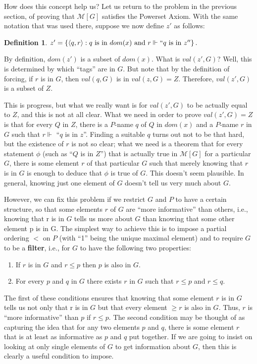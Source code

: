 \documentclass[10pt]{article}
\theoremstyle{definition}
\newtheorem*{defn}{Definition}
\theoremstyle{remark}
\begin{document}
How does this concept help us? Let us return to the problem in the previous section, of proving that $\mathcal M[G]$ satisfies the Powerset Axiom. With the same notation that was used there, suppose we now define $z'$ as follows:

\begin{defn}
$z' = \left\{\langle q,r\rangle : q\text{ is in }dom(x)\text{ and }r \Vdash ``q\text{ is in }z''\right\}.$
\end{defn}

By definition, $dom(z')$ is a subset of $dom(x)$. What is $val(z',G)$? Well, this is determined by which ``tags'' are in $G$. But note that by the definition of forcing, if $r$ is in $G$, then $val(q,G)$ is in $val(z,G) = Z$. Therefore, $val(z',G)$ is a subset of $Z$.

This is progress, but what we really want is for $val(z',G)$ to be actually equal to $Z$, and this is not at all clear. What we need in order to prove $val(z',G) = Z$ is that for every $Q$ in $Z$, there is a $P$-name $q$ of $Q$ in $dom(x)$ and a $P$-name $r$ in $G$ such that $r \Vdash$ ``$q$ is in $z$''. Finding a suitable $q$ turns out not to be that hard, but the existence of $r$ is not so clear; what we need is a theorem that for every statement $\phi$ (such as ``$Q$ is in $Z$'') that is actually true in $\mathcal M[G]$ for a particular $G$, there is some element $r$ of that particular $G$ such that merely knowing that $r$ is in $G$ is enough to deduce that $\phi$ is true of $G$. This doesn't seem plausible. In general, knowing just one element of $G$ doesn't tell us very much about $G$.

However, we can fix this problem if we restrict $G$ and $P$ to have a certain structure, so that some elements $r$ of $G$ are ``more informative'' than others, i.e., knowing that r is in $G$ tells us more about $G$ than knowing that some other element p is in G. The simplest way to achieve this is to impose a partial ordering $<$ on $P$ (with ``1'' being the unique maximal element) and to require $G$ to be a \textbf{filter}, i.e., for $G$ to have the following two properties:

\begin{enumerate}
\item If $r$ is in $G$ and $r \leq p$ then $p$ is also in $G$.
\item For every $p$ and $q$ in $G$ there exists $r$ in $G$ such that $r \leq p$ and $r \leq q$.
\end{enumerate}

The first of these conditions ensures that knowing that some element $r$ is in $G$ tells us not only that r is in $G$ but that every element $\geq r$ is also in $G$. Thus, $r$ is ``more informative'' than $p$ if $r \leq p$. The second condition may be thought of as capturing the idea that for any two elements $p$ and $q$, there is some element $r$ that is at least as informative as $p$ and $q$ put together. If we are going to insist on looking at only single elements of $G$ to get information about $G$, then this is clearly a useful condition to impose.
\end{document}
